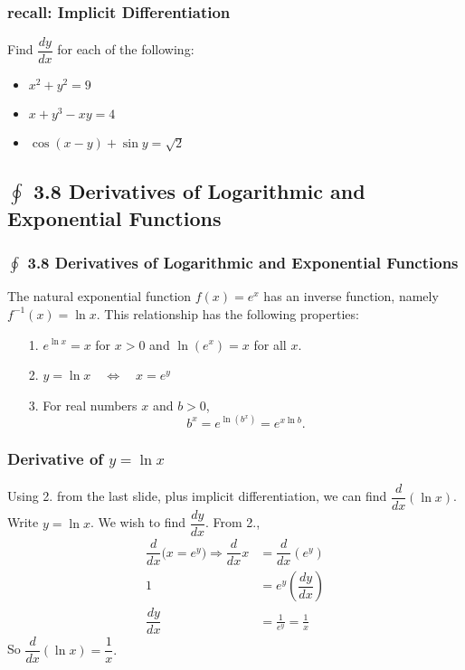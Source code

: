 \documentclass[14pt]{beamer}
\begin{document}
\begin{frame}
\frametitle{recall: Implicit Differentiation}
\begin{exe} Find $\dfrac{dy}{dx}$ for each of the following:

\begin{itemize}
\item $x^2 + y^2 = 9$

\vspace{0.5pc}
\item $x+y^3-xy=4$

\vspace{0.5pc}
\item $\cos(x-y)+\sin y = \sqrt{2}$
\end{itemize}
\end{exe}
\end{frame}

\begin{frame}
\subsection[3.8 Derivatives of Logarithmic and Exponential Functions]{$\oint$ 3.8 Derivatives of Logarithmic and Exponential Functions}
\frametitle{$\oint$ 3.8 Derivatives of Logarithmic and Exponential Functions}
\small
The natural exponential function $f(x)=e^x$ has an inverse function, namely $f^{-1}(x)=\ln x$.  This relationship has the following properties:
\begin{itemize}
\item[1.] $e^{\ln x}=x $ for $x>0$ and $\ln(e^x)=x$ for all $x$.
\item[2.] $y=\ln x \quad\Longleftrightarrow\quad x=e^y$
\item[3.] For real numbers $x$ and $b>0$, 
\[b^x=e^{\ln (b^x)}=e^{x \ln b}.\]
\end{itemize}
\end{frame}

\begin{frame}
\frametitle{Derivative of $y=\ln x$}
\footnotesize
Using 2. from the last slide, plus implicit differentiation, we can find $\displaystyle\dfrac{d}{dx}\left(\ln x\right)$.  Write $y=\ln x$.  We wish to find $\dfrac{dy}{dx}$.  From 2.,
\begin{align*}
\dfrac{d}{dx}\big(x=e^y\big) \Rightarrow \dfrac{d}{dx}x &= \dfrac{d}{dx}(e^y) \\[0.5pc]
1 &= e^y\left(\dfrac{dy}{dx}\right) \\[0.5pc]
\dfrac{dy}{dx} &= \frac{1}{e^y}=\frac{1}{x} 
\end{align*}
So $\dfrac{d}{dx}(\ln x)=\dfrac{1}{x}.$
\end{frame}
\end{document}
